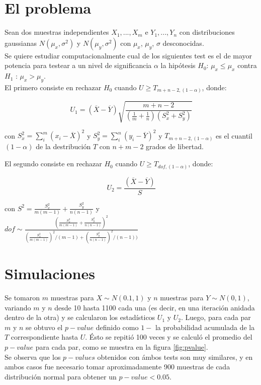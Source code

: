 \documentclass[%
 reprint,
 amsmath,amssymb,
 aps,
spanish]{revtex4-1}
\begin{document}
\section{El problema}
Sean dos muestras independientes $X_1,...,X_m$ e $Y_1,...,Y_n$ con distribuciones gaussianas $N(\mu_x, \sigma^2)$ y $N(\mu_y, \sigma^2)$ con $\mu_x$, $\mu_y$, $\sigma$ desconocidas.\\
Se quiere estudiar computacionalmente cual de los siguientes test es el de mayor potencia para testear a un nivel de significancia $\alpha$ la hipótesis $H_0$: $\mu_x \leq \mu_x$ contra $H_1$ : 
$\mu_x > \mu_y$.\\
El primero consiste en rechazar $H_0$ cuando $U \geq T_{m+n-2, (1-\alpha)}$, donde:

\begin{equation}
U_1=(\overline{X}-\overline{Y})\sqrt{\frac{m+n-2}{ (\frac{1}{m}+\frac{1}{n})(S_x^2 + S_y^2)  }}
\label{U1}
\end{equation}

con $S_x^2 = \sum_i^m (x_i-\overline{X})^2$ y $S_y^2 = \sum_i^n (y_i-\overline{Y})^2$ y $T_{m+n-2, (1-\alpha)}$ es el cuantil $(1-\alpha)$ de la destribución $T$ con $n+m-2$ grados de libertad.

El segundo consiste en rechazar $H_0$ cuando $U \geq T_{dof, (1-\alpha)}$, donde:

\begin{equation}
U_2=\frac{(\overline{X}-\overline{Y})}{S}
\label{U2}
\end{equation}

con $S^2 = \frac{S_x^2}{m(m-1)} + \frac{S_y^2}{n(n-1)}$ y \\$dof \sim \frac{(\frac{S_x^2}{m(m-1)} + \frac{S_y^2}{n(n-1)})^2}{(\frac{S_x^2}{m(m-1)})^2/(m-1)+(\frac{S_y^2}{n(n-1)})^2/(n-1))}$

\section{Simulaciones}
Se tomaron $m$ muestras para $X \sim N(0.1, 1)$ y $n$ muestras para $Y \sim N(0, 1)$, variando $m$ y $n$ desde 10 hasta 1100 cada una (es decir, en una iteración anidada dentro de la otra) y se 
calcularon los estadísticos $U_1$ y $U_2$. Luego, para cada par $m$ y $n$ se obtuvo el $p-value$ definido como $1-$ la probabilidad acumulada de la $T$ correspondiente hasta $U$. Ésto se repitió 
100 veces y se calculó el promedio del $p-value$ para cada par, como se muestra en la figura \ref{fig:pvalue}.\\
Se observa que los $p-values$ obtenidos con ámbos tests son muy similares, y en ambos casos fue necesario tomar aproximadamente 900 muestras de cada distribución normal para obtener un $p-value < 
0.05$.\\
\end{document}
